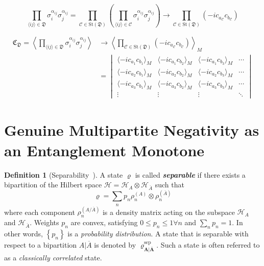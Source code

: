\documentclass[12font]{article}
\theoremstyle{definition}
\newtheorem{definition}{Definition}[section]
\newcommand{\anglelr}[1]{\langle #1 \rangle}
\newcommand{\Anglelr}[1]{\left\langle #1 \right\rangle}
\newcommand{\lr}[1]{\left(  #1  \right)}
\newcommand{\lrg}[1]{\left\{  #1  \right\}}
\newcommand{\mrm}[1]{\mathrm{#1}}
\newcommand{\bog}[1]{\boldsymbol{#1}}
\newcommand{\tcor}[2]{\langle -ic_{#1}c_{#2} \rangle_M}
\newcommand{\dimer}[2]{\sigma_{#1}^{\alpha_{#1#2}}\sigma_{#2}^{\alpha_{#1#2}}}
\begin{document}
\begin{equation}
    \prod_{\anglelr{ij}\in\mathfrak{D}}
    \dimer{i}{j}
    =
    \prod_{\mathcal{C} \in \mrm{St}(\mathfrak{D})}
    \lr{
        \prod_{\anglelr{ij}\in\mathcal{C}}
        \dimer{i}{j}
    }
    \to 
    \prod_{\mathcal{C} \in \mrm{St}(\mathfrak{D})} 
    \lr{-i c_{a_{\mathcal{C}}}c_{b_{\mathcal{C}}} }
\end{equation}

\begin{align}\label{eq:multi-correlation}
    \mathfrak{C}_{\mathfrak{D}}
    =
    \Anglelr{\prod_{\anglelr{ij}\in\mathfrak{D}}
    \dimer{i}{j}}
    &\to
    \Anglelr{
    \prod_{\mathcal{C} \in \mrm{St}(\mathfrak{D})} 
        \lr{-i c_{a_{\mathcal{C}}}c_{b_{\mathcal{C}}} }
    }_M \nonumber \\
    &=
    \begin{vmatrix}
        \tcor{a_1}{b_1} & \tcor{a_1}{b_2} & \tcor{a_1}{b_3} & \cdots \\
        \tcor{a_2}{b_1} & \tcor{a_2}{b_2} & \tcor{a_2}{b_3} & \cdots \\
        \tcor{a_3}{b_1} & \tcor{a_3}{b_2} & \tcor{a_3}{b_3} & \cdots \\
        \vdots & \vdots & \vdots & \ddots
    \end{vmatrix}
\end{align}

\section{Genuine Multipartite Negativity as an Entanglement Monotone}


\begin{definition}[Separability~\cite{Guhne-Toth_2009}]\label{def:sep}
    A state $\varrho$ is called \textbf{\textit{separable}} if there exists a bipartition of the Hilbert space $\mathcal{H} = \mathcal{H}_A\otimes\mathcal{H}_{\overline{A}}$ such that
    \begin{equation}\label{eq:sep-def}
        \varrho = \sum_{n} p_n \rho^{(A)}_n
        \otimes \rho^{(\overline{A})}_n
    \end{equation}
    where each component $\rho^{(A/\overline{A})}_n$ is a density matrix acting on the subspace $\mathcal{H}_A$ and $\mathcal{H}_{\overline{A}}$. Weights $p_n$ are convex, satisfying $0\leq p_n\leq 1\forall n$ and $\sum_{n}p_n = 1$. In other words, $\lrg{p_n}$ is a \textit{probability distribution}. A state that is separable with respect to a bipartition $A|\overline{A}$ is denoted by $\bog{\varrho^{\mrm{sep}}_{A|\overline{A}}}$. Such a state is often referred to as a \textit{classically correlated} state.
\end{definition}
\end{document}
